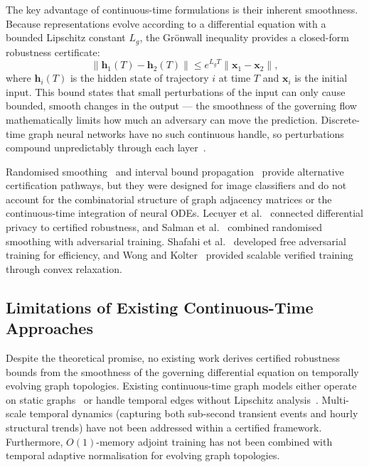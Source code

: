 The key advantage of continuous-time formulations is their inherent smoothness. Because representations evolve according to a differential equation with a bounded Lipschitz constant $L_g$, the Gr\"{o}nwall inequality provides a closed-form robustness certificate:
\begin{equation}
\|\mathbf{h}_1(T) - \mathbf{h}_2(T)\| \leq e^{L_g T}\|\mathbf{x}_1 - \mathbf{x}_2\|,
\label{eq:ch1_gronwall}
\end{equation}
where $\mathbf{h}_i(T)$ is the hidden state of trajectory $i$ at time $T$ and $\mathbf{x}_i$ is the initial input. This bound states that small perturbations of the input can only cause bounded, smooth changes in the output --- the smoothness of the governing flow mathematically limits how much an adversary can move the prediction. Discrete-time graph neural networks have no such continuous handle, so perturbations compound unpredictably through each layer~\cite{Zhao2023hamilton}.

Randomised smoothing~\cite{Cohen2019} and interval bound propagation~\cite{Gowal2019} provide alternative certification pathways, but they were designed for image classifiers and do not account for the combinatorial structure of graph adjacency matrices or the continuous-time integration of neural ODEs. Lecuyer et al.~\cite{Lecuyer2019} connected differential privacy to certified robustness, and Salman et al.~\cite{Salman2019} combined randomised smoothing with adversarial training. Shafahi et al.~\cite{Shafahi2019} developed free adversarial training for efficiency, and Wong and Kolter~\cite{Wong2020} provided scalable verified training through convex relaxation.


\subsection{Limitations of Existing Continuous-Time Approaches}

Despite the theoretical promise, no existing work derives certified robustness bounds from the smoothness of the governing differential equation on temporally evolving graph topologies. Existing continuous-time graph models either operate on static graphs~\cite{Chamberlain2021} or handle temporal edges without Lipschitz analysis~\cite{Xu2020tgat,Rossi2020,Pei2020tgn,Kazemi2020,Wang2021tedic}. Multi-scale temporal dynamics (capturing both sub-second transient events and hourly structural trends) have not been addressed within a certified framework. Furthermore, $O(1)$-memory adjoint training has not been combined with temporal adaptive normalisation for evolving graph topologies.

